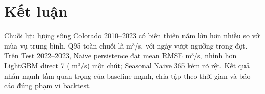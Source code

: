 \section{Kết luận}

Chuỗi lưu lượng sông Colorado 2010--2023 có biến thiên năm lớn hơn nhiều so với mùa vụ
trung bình. Q95 toàn chuỗi là \QHigh{} m³/s, với \NDaysHigh{} ngày vượt ngưỡng trong
\NEvents{} đợt. Trên Test 2022--2023, Naive persistence đạt mean RMSE \NaiveMeanRmse{}
m³/s, nhỉnh hơn LightGBM direct 7 (\LgbmMeanRmse{} m³/s) một chút; Seasonal Naive 365
kém rõ rệt. Kết quả nhấn mạnh tầm quan trọng của baseline mạnh, chia tập theo thời gian
và báo cáo đúng phạm vi backtest.
